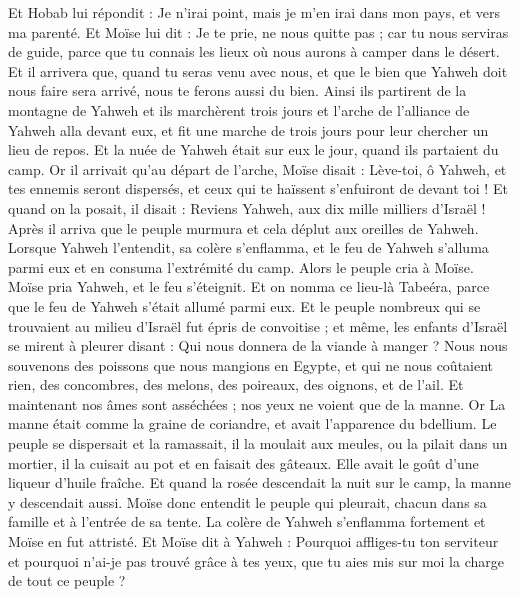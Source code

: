 \begin{multicols}{2}
Et Hobab lui répondit : Je n'irai point, mais je m'en irai dans mon pays, et vers ma parenté.
Et Moïse lui dit : Je te prie, ne nous quitte pas ; car tu nous serviras de guide, parce que tu connais les lieux où nous aurons à camper dans le désert.
Et il arrivera que, quand tu seras venu avec nous, et que le bien que Yahweh doit nous faire sera arrivé, nous te ferons aussi du bien.
Ainsi ils partirent de la montagne de Yahweh et ils marchèrent trois jours et l'arche de l'alliance de Yahweh alla devant eux, et fit une marche de trois jours pour leur chercher un lieu de repos.
Et la nuée de Yahweh était sur eux le jour, quand ils partaient du camp.
Or il arrivait qu'au départ de l'arche, Moïse disait : Lève-toi, ô Yahweh, et tes ennemis seront dispersés, et ceux qui te haïssent s'enfuiront de devant toi !
Et quand on la posait, il disait : Reviens Yahweh, aux dix mille milliers d'Israël !
\VerseOne{}Après il arriva que le peuple murmura et cela déplut aux oreilles de Yahweh. Lorsque Yahweh l'entendit, sa colère s'enflamma, et le feu de Yahweh s'alluma parmi eux et en consuma l'extrémité du camp.
Alors le peuple cria à Moïse. Moïse pria Yahweh, et le feu s'éteignit.
Et on nomma ce lieu-là Tabeéra, parce que le feu de Yahweh s'était allumé parmi eux.
Et le peuple nombreux qui se trouvaient au milieu d'Israël fut épris de convoitise ; et même, les enfants d'Israël se mirent à pleurer disant : Qui nous donnera de la viande à manger ?
Nous nous souvenons des poissons que nous mangions en Egypte, et qui ne nous coûtaient rien, des concombres, des melons, des poireaux, des oignons, et de l'ail.
Et maintenant nos âmes sont asséchées ; nos yeux ne voient que de la manne.
Or La manne était comme la graine de coriandre, et avait l'apparence du bdellium.
Le peuple se dispersait et la ramassait, il la moulait aux meules, ou la pilait dans un mortier, il la cuisait au pot et en faisait des gâteaux. Elle avait le goût d'une liqueur d'huile fraîche.
Et quand la rosée descendait la nuit sur le camp, la manne y descendait aussi.
Moïse donc entendit le peuple qui pleurait, chacun dans sa famille et à l'entrée de sa tente. La colère de Yahweh s'enflamma fortement et Moïse en fut attristé.
Et Moïse dit à Yahweh : Pourquoi affliges-tu ton serviteur et pourquoi n'ai-je pas trouvé grâce à tes yeux, que tu aies mis sur moi la charge de tout ce peuple ?

\end{multicols}
